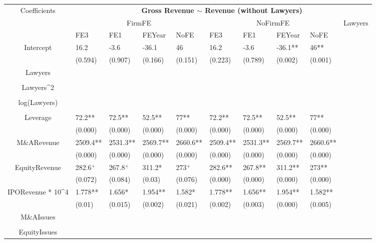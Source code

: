\documentclass{article}
\begin{document}
\begin{table}[H]
\centering
\begin{tabular}{|clllllllll|}
\hline
\multirow{3}{*}{Coefficients} & \multicolumn{9}{c|}{\textbf{Gross Revenue $\sim$ Revenue (without Lawyers)}} \\
\cline{2-10}
& \multicolumn{4}{c}{FirmFE} & \multicolumn{4}{c}{NoFirmFE} & \multirow{2}{*}{Lawyers} \\
\cline{2-9}
& FE3 & FE1 & FEYear & NoFE & FE3 & FE1 & FEYear & NoFE &  \\
\hline
 
Intercept & 16.2 & -3.6 & -36.1 & 46 & 16.2 & -3.6 & -36.1** & 46** & \\ 
   & (0.594) & (0.907) & (0.166) & (0.151) & (0.223) & (0.789) & (0.002) & (0.001) & \\ 
  Lawyers &  &  &  &  &  &  &  &  & \\ 
   &  &  &  &  &  &  &  &  & \\ 
  Lawyers^2 &  &  &  &  &  &  &  &  & \\ 
   &  &  &  &  &  &  &  &  & \\ 
  log(Lawyers) &  &  &  &  &  &  &  &  & \\ 
   &  &  &  &  &  &  &  &  & \\ 
  Leverage & 72.2** & 72.5** & 52.5** & 77** & 72.2** & 72.5** & 52.5** & 77** & \\ 
   & (0.000) & (0.000) & (0.000) & (0.000) & (0.000) & (0.000) & (0.000) & (0.000) & \\ 
  M\&ARevenue & 2509.4** & 2531.3** & 2569.7** & 2660.6** & 2509.4** & 2531.3** & 2569.7** & 2660.6** & \\ 
   & (0.000) & (0.000) & (0.000) & (0.000) & (0.000) & (0.000) & (0.000) & (0.000) & \\ 
  EquityRevenue & 282.6$^{+}$ & 267.8$^{+}$ & 311.2* & 273$^{+}$ & 282.6** & 267.8** & 311.2** & 273** & \\ 
   & (0.072) & (0.084) & (0.03) & (0.076) & (0.000) & (0.000) & (0.000) & (0.000) & \\ 
  IPORevenue * 10^4 & 1.778** & 1.656* & 1.954** & 1.582* & 1.778** & 1.656** & 1.954** & 1.582** & \\ 
   & (0.01) & (0.015) & (0.002) & (0.021) & (0.002) & (0.003) & (0.000) & (0.005) & \\ 
  M\&AIssues &  &  &  &  &  &  &  &  & \\ 
   &  &  &  &  &  &  &  &  & \\ 
  EquityIssues &  &  &  &  &  &  &  &  & \\ 

\end{tabular}
\end{table}
\end{document}
